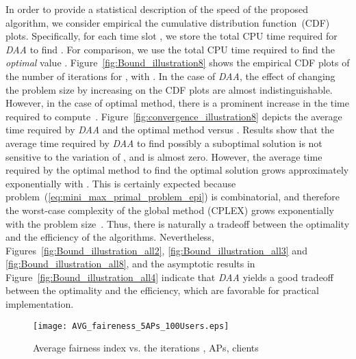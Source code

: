 \documentclass[journal, 10pt, twocolumn]{IEEEtran}
\begin{document}
In order to provide a statistical description of the speed of
the proposed algorithm, we consider empirical the cumulative distribution function~(CDF) plots. Specifically, for each time slot , we store the total CPU time required for \emph{DAA} to find . For comparison, we use the total CPU time required to find the \emph{optimal} value . Figure~\ref{fig:Bound_illustration8} shows the empirical CDF plots of the number of iterations for , with . In the case of \emph{DAA}, the effect of changing the problem size by increasing  on the CDF plots are almost indistinguishable. However, in the case of optimal method, there is a prominent increase in the time required to compute~. Figure~\ref{fig:convergence_illustration8} depicts the average time required by \emph{DAA} and the optimal method versus . Results show that the average time required by \emph{DAA} to find possibly a suboptimal solution is not sensitive to the variation of , and is almost zero. However, the average time required by the optimal method to find the optimal solution grows approximately exponentially with . This is certainly expected because problem~(\ref{eq:mini_max_primal_problem_epi}) is combinatorial, and therefore the worst-case complexity of the global method (CPLEX) grows exponentially with the problem size~\cite[\S~1.4.2]{Boyd-Vandenberghe-04}. Thus, there is naturally a tradeoff between the optimality and the efficiency of the algorithms. Nevertheless, Figures~\ref{fig:Bound_illustration_all2}, \ref{fig:Bound_illustration_all3} and \ref{fig:Bound_illustration_all8}, and the asymptotic results in Figure~\ref{fig:Bound_illustration_all4} indicate that \emph{DAA} yields a good tradeoff between the
optimality and the efficiency, which are favorable for practical implementation.


\begin{figure}[t]
\centering
{\texttt{[image: AVG\_faireness\_5APs\_100Users.eps]}}\vspace{-2mm}
\caption{Average fairness index vs. the iterations ,  APs,  clients}
\label{fig:Bound_illustration_all6}
\vspace{-0.4cm}
\end{figure}
\end{document}
